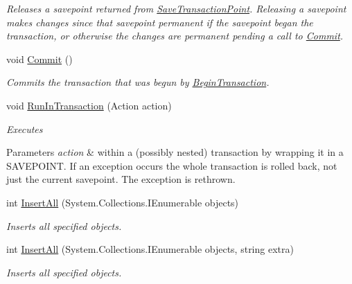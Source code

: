 \begin{DoxyCompactItemize}
\begin{DoxyCompactList}\small\item\em Releases a savepoint returned from \hyperlink{classSQLite_1_1SQLiteConnection_ab571412a681990a95131ded731ad6c4a}{Save\-Transaction\-Point}. Releasing a savepoint makes changes since that savepoint permanent if the savepoint began the transaction, or otherwise the changes are permanent pending a call to \hyperlink{classSQLite_1_1SQLiteConnection_a2c8187a19b5065f6b23c079e7cca29fe}{Commit}. \end{DoxyCompactList}\item 
void \hyperlink{classSQLite_1_1SQLiteConnection_a2c8187a19b5065f6b23c079e7cca29fe}{Commit} ()
\begin{DoxyCompactList}\small\item\em Commits the transaction that was begun by \hyperlink{classSQLite_1_1SQLiteConnection_aba3becdb524808bd49f349587f1b7049}{Begin\-Transaction}. \end{DoxyCompactList}\item 
void \hyperlink{classSQLite_1_1SQLiteConnection_a9132bae9e577ae479ddc6b919547759f}{Run\-In\-Transaction} (Action action)
\begin{DoxyCompactList}\small\item\em Executes 
\begin{DoxyParams}{Parameters}
{\em action} & within a (possibly nested) transaction by wrapping it in a S\-A\-V\-E\-P\-O\-I\-N\-T. If an exception occurs the whole transaction is rolled back, not just the current savepoint. The exception is rethrown. \\
\hline
\end{DoxyParams}
\end{DoxyCompactList}\item 
int \hyperlink{classSQLite_1_1SQLiteConnection_a920c3f7421ad1c967730228abb5915fc}{Insert\-All} (System.\-Collections.\-I\-Enumerable objects)
\begin{DoxyCompactList}\small\item\em Inserts all specified objects. \end{DoxyCompactList}\item 
int \hyperlink{classSQLite_1_1SQLiteConnection_a62b62415941ce6486f7dfa219a69f1f1}{Insert\-All} (System.\-Collections.\-I\-Enumerable objects, string extra)
\begin{DoxyCompactList}\small\item\em Inserts all specified objects. \end{DoxyCompactList}\item 

\end{DoxyCompactItemize}
